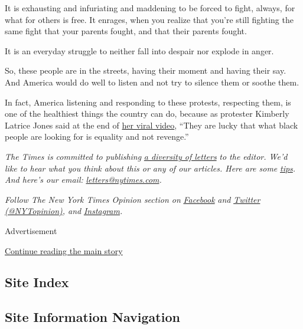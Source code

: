 It is exhausting and infuriating and maddening to be forced to fight,
always, for what for others is free. It enrages, when you realize that
you're still fighting the same fight that your parents fought, and that
their parents fought.

It is an everyday struggle to neither fall into despair nor explode in
anger.

So, these people are in the streets, having their moment and having
their say. And America would do well to listen and not try to silence
them or soothe them.

In fact, America listening and responding to these protests, respecting
them, is one of the healthiest things the country can do, because as
protester Kimberly Latrice Jones said at the end of
\href{https://www.instagram.com/tv/CA5gksAgvxJ/?utm_source=ig_embed}{her
viral video}, ``They are lucky that what black people are looking for is
equality and not revenge.''

\emph{The Times is committed to publishing}
\href{https://www.nytimes.com/2019/01/31/opinion/letters/letters-to-editor-new-york-times-women.html}{\emph{a
diversity of letters}} \emph{to the editor. We'd like to hear what you
think about this or any of our articles. Here are some}
\href{https://help.nytimes.com/hc/en-us/articles/115014925288-How-to-submit-a-letter-to-the-editor}{\emph{tips}}\emph{.
And here's our email:}
\href{mailto:letters@nytimes.com}{\emph{letters@nytimes.com}}\emph{.}

\emph{Follow The New York Times Opinion section on}
\href{https://www.facebook.com/nytopinion}{\emph{Facebook}} \emph{and}
\href{http://twitter.com/NYTOpinion}{\emph{Twitter
(@NYTopinion)}}\emph{, and}
\href{https://www.instagram.com/nytopinion/}{\emph{Instagram}}\emph{.}

Advertisement

\protect\hyperlink{after-bottom}{Continue reading the main story}

\hypertarget{site-index}{%
\subsection{Site Index}\label{site-index}}

\hypertarget{site-information-navigation}{%
\subsection{Site Information
Navigation}\label{site-information-navigation}}

